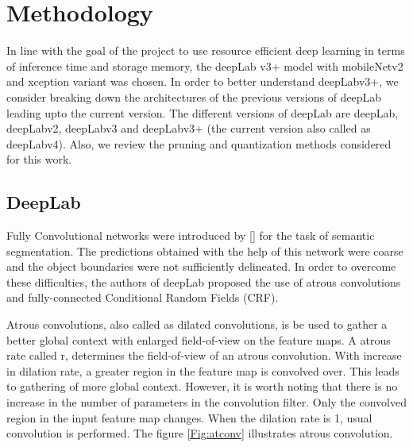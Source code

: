 \chapter{Methodology}

In line with the goal of the project to use resource efficient deep learning in terms of inference time and storage memory, the deepLab v3+ model with mobileNetv2 and xception variant was chosen. In order to better understand deepLabv3+, we consider breaking down the architectures of the previous versions of deepLab leading upto the current version. The different versions of deepLab are deepLab, deepLabv2, deepLabv3 and deepLabv3+ (the current version also called as deepLabv4). Also, we review the pruning and quantization methods considered for this work.

\section{DeepLab}

Fully Convolutional networks were introduced by [] for the task of semantic segmentation. The predictions obtained with the help of this network were coarse and the object boundaries were not sufficiently delineated. In order to overcome these difficulties, the authors of deepLab proposed the use of atrous convolutions and fully-connected Conditional Random Fields (CRF).

Atrous convolutions, also called as dilated convolutions, is be used to gather a better global context with enlarged field-of-view on the feature maps. A atrous rate called r, determines the field-of-view of an atrous convolution. With increase in dilation rate, a greater region in the feature map is convolved over. This leads to gathering of more global context. However, it is worth noting that there is no increase in the number of parameters in the convolution filter. Only the convolved region in the input feature map changes. When the dilation rate is 1, usual convolution is performed. The figure \ref{Fig:atconv} illustrates atrous convolution. 

